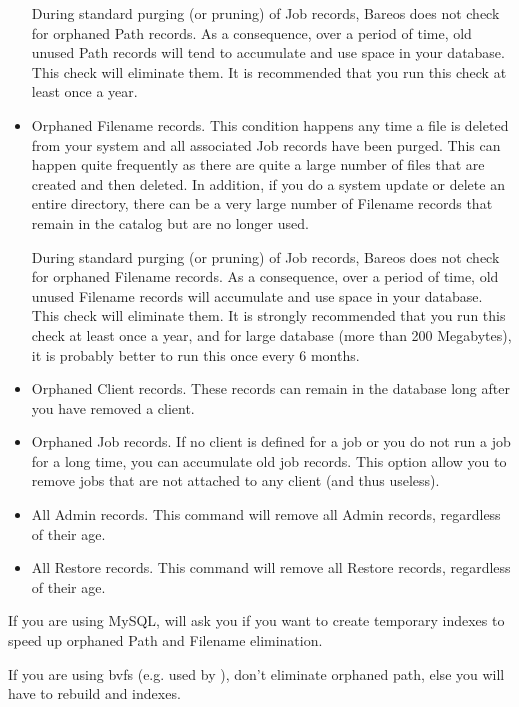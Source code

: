 \begin{itemize}
   During standard purging (or pruning) of Job records, Bareos does  not check
   for orphaned Path records. As a consequence, over a period  of time, old
   unused Path records will tend to accumulate and use  space in your database.
   This check will eliminate them. It is recommended that you run this
   check at least once a year.
\item Orphaned Filename records. This condition happens any time a file is
   deleted from your system and all associated Job records have been purged.
   This can happen quite frequently as there are quite a large number  of files
   that are created and then deleted. In addition, if you  do a system update or
   delete an entire directory, there can be  a very large number of Filename
   records that remain in the catalog  but are no longer used.

   During standard purging (or pruning) of Job records, Bareos does  not check
   for orphaned Filename records. As a consequence, over a period  of time, old
   unused Filename records will accumulate and use  space in your database. This
   check will eliminate them. It is strongly  recommended that you run this check
   at least once a year, and for  large database (more than 200 Megabytes), it is
   probably better to  run this once every 6 months.
\item Orphaned Client records. These records can remain in the database  long
   after you have removed a client.
\item Orphaned Job records. If no client is defined for a job or you  do not
   run a job for a long time, you can accumulate old job  records. This option
   allow you to remove jobs that are not  attached to any client (and thus
   useless).
\item All Admin records. This command will remove all Admin records,
   regardless of their age.
\item All Restore records. This command will remove all Restore records,
   regardless of their age.
\end{itemize}


If you are using MySQL,  will ask you if you want to create temporary
indexes to speed up orphaned Path and Filename elimination.

If you are using bvfs (e.g. used by ),
don't eliminate orphaned path, else you will
have to rebuild  and
 indexes.

